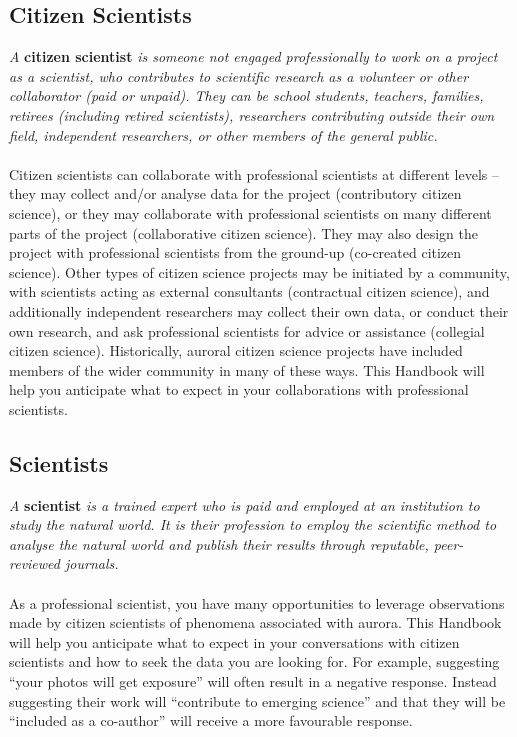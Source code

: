 \documentclass{article}
\begin{document}
\subsection{Citizen Scientists}

\textit{A} \textbf{citizen scientist} \textit{is someone not engaged professionally to work on a project as a scientist, who contributes to scientific research as a volunteer or other collaborator (paid or unpaid). They can be school students, teachers, families, retirees (including retired scientists), researchers contributing outside their own field, independent researchers, or other members of the general public.}\\
\\
Citizen scientists can collaborate with professional scientists at different levels -- they may collect and/or analyse data for the project (contributory citizen science), or they may collaborate with professional scientists on many different parts of the project (collaborative citizen science). They may also design the project with professional scientists from the ground-up (co-created citizen science). Other types of citizen science projects may be initiated by a community, with scientists acting as external consultants (contractual citizen science), and additionally independent researchers may collect their own data, or conduct their own research, and ask professional scientists for advice or assistance (collegial citizen science). Historically, auroral citizen science projects have included members of the wider community in many of these ways. This Handbook will help you anticipate what to expect in your collaborations with professional scientists.

\subsection{Scientists}

\textit{A} \textbf{scientist} \textit{is a trained expert who is paid and employed at an institution to study the natural world. It is their profession to employ the scientific method to analyse the natural world and publish their results through reputable, peer-reviewed journals.}\\
\\
As a professional scientist, you have many opportunities to leverage observations made by citizen scientists of phenomena associated with aurora. This Handbook will help you anticipate what to expect in your conversations with citizen scientists and how to seek the data you are looking for. For example, suggesting ``your photos will get exposure'' will often result in a negative response. Instead suggesting their work will ``contribute to emerging science'' and that they will be ``included as a co-author'' will receive a more favourable response.
\end{document}
